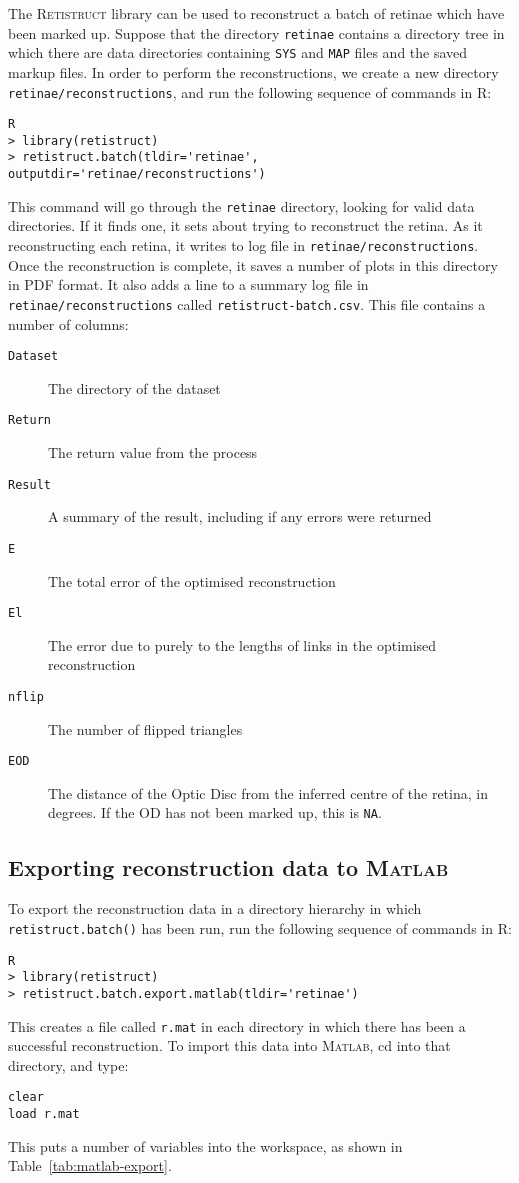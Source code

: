\documentclass{article}
\begin{document}
The \textsc{Retistruct} library can be used to reconstruct a batch of
retinae which have been marked up. Suppose that the directory
\texttt{retinae} contains a directory tree in which there are data
directories containing \texttt{SYS} and \texttt{MAP} files and the
saved markup files. In order to perform the reconstructions, we create
a new directory \texttt{retinae/reconstructions}, and run the
following sequence of commands in R:
\begin{verbatim}
R
> library(retistruct)
> retistruct.batch(tldir='retinae', outputdir='retinae/reconstructions')
\end{verbatim}
This command will go through the \texttt{retinae} directory, looking
for valid data directories. If it finds one, it sets about trying to
reconstruct the retina. As it reconstructing each retina, it writes to
log file in \texttt{retinae/reconstructions}. Once the reconstruction
is complete, it saves a number of plots in this directory in PDF
format. It also adds a line to a summary log file in
\texttt{retinae/reconstructions} called
\texttt{retistruct-batch.csv}. This file contains a number of columns:
\begin{description}
\item[\texttt{Dataset}] The directory of the dataset
\item[\texttt{Return}] The return value from the process
\item[\texttt{Result}] A summary of the result, including if any
  errors were returned
\item[\texttt{E}] The total error  of the optimised reconstruction
\item[\texttt{El}] The error due to purely to the lengths of links in
  the optimised reconstruction
\item[\texttt{nflip}] The number of flipped triangles
\item[\texttt{EOD}] The distance of the Optic Disc from the inferred
  centre of the retina, in degrees. If the OD has not been marked up,
  this is \texttt{NA}.
\end{description}

\subsection{Exporting reconstruction data to \textsc{Matlab}}
\label{retistruct-manual:sec:export-reconstr-data}

To export the reconstruction data in a directory hierarchy in which
\texttt{retistruct.batch()} has been run, run the following sequence
of commands in R:
\begin{verbatim}
R
> library(retistruct)
> retistruct.batch.export.matlab(tldir='retinae')
\end{verbatim}
This creates a file called \texttt{r.mat} in each directory in which
there has been a successful reconstruction. To import this data into
\textsc{Matlab}, cd into that directory, and type:
\begin{verbatim}
clear
load r.mat
\end{verbatim}
This puts a number of variables into the workspace, as shown in
Table~\ref{tab:matlab-export}.
\end{document}
